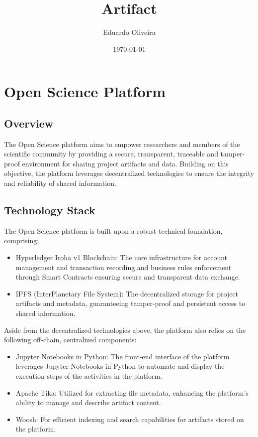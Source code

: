 \documentclass{article}
\title{Artifact}
\author{Eduardo Oliveira}
\date{\today}
\begin{document}
\maketitle

\section{Open Science Platform}

\subsection{Overview}

The Open Science platform aims to empower researchers and members of the scientific community by providing a secure, transparent, traceable and tamper-proof environment for sharing project artifacts and data. Building on this objective, the platform leverages decentralized technologies to ensure the integrity and reliability of shared information.


\subsection{Technology Stack}

The Open Science platform is built upon a robust technical foundation, comprising:

\begin{itemize}
      \item Hyperledger Iroha v1 Blockchain: The core infrastructure for account management and transaction recording and business rules enforcement through Smart Contracts ensuring secure and transparent data exchange.
      \item IPFS (InterPlanetary File System): The decentralized storage for project artifacts and metadata, guaranteeing tamper-proof and persistent access to shared information.
\end{itemize}


Aside from the decentralized technologies above, the platform also relies on the following off-chain, centralized components:

\begin{itemize}
      \item Jupyter Notebooks in Python: The front-end interface of the platform leverages Jupyter Notebooks in Python to automate and display the execution steps of the activities in the platform.
      \item Apache Tika: Utilized for extracting file metadata, enhancing the platform's ability to manage and describe artifact content.
      \item Woosh: For efficient indexing and search capabilities for artifacts stored on the platform.
\end{itemize}
\end{document}
